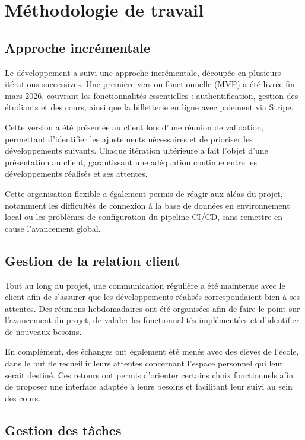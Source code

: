 \documentclass{article}
\begin{document}
\section{Méthodologie de travail}

\subsection{Approche incrémentale}

Le développement a suivi une approche incrémentale, découpée 
en plusieurs itérations successives. Une première version 
fonctionnelle (MVP) a été livrée fin mars 2026, couvrant 
les fonctionnalités essentielles : authentification, gestion 
des étudiants et des cours, ainsi que la billetterie en ligne 
avec paiement via Stripe.

Cette version a été présentée au client lors d'une réunion de 
validation, permettant d'identifier les ajustements nécessaires 
et de prioriser les développements suivants. Chaque itération 
ultérieure a fait l'objet d'une présentation au client, 
garantissant une adéquation continue entre les développements 
réalisés et ses attentes.

Cette organisation flexible a également permis de réagir aux 
aléas du projet, notamment les difficultés de connexion à la 
base de données en environnement local ou les problèmes de 
configuration du pipeline CI/CD, sans remettre en cause 
l'avancement global.

\subsection{Gestion de la relation client}

Tout au long du projet, une communication régulière a été maintenue avec 
le client afin de s'assurer que les développements réalisés correspondaient 
bien à ses attentes. Des réunions hebdomadaires ont été organisées afin de 
faire le point sur l'avancement du projet, de valider les fonctionnalités 
implémentées et d'identifier de nouveaux besoins.

En complément, des échanges ont également été menés avec des élèves de 
l'école, dans le but de recueillir leurs attentes concernant l'espace 
personnel qui leur serait destiné. Ces retours ont permis d'orienter 
certains choix fonctionnels afin de proposer une interface adaptée à leurs 
besoins et facilitant leur suivi au sein des cours.

\subsection{Gestion des tâches}
\end{document}
